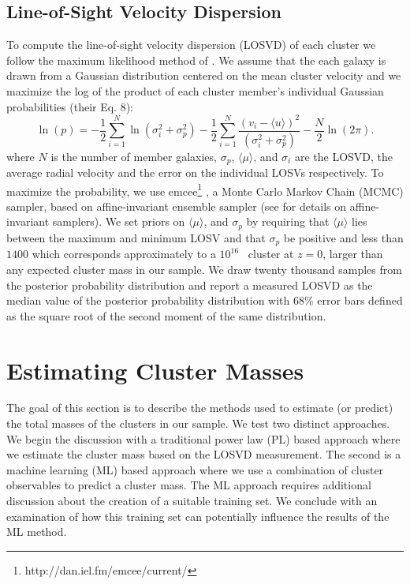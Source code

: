 \subsection{Line-of-Sight Velocity Dispersion}\label{2sec:LOSVD}
To compute the line-of-sight velocity dispersion (LOSVD) of each cluster we follow the maximum likelihood method of \cite{Walker2006}. We assume that the each galaxy is drawn from a Gaussian distribution centered on the mean cluster velocity and we maximize the log of the product of each cluster member's individual Gaussian probabilities (their Eq. 8):
\begin{equation}
  \label{2eq:log}
\ln(p)=-\frac{1}{2}\sum_{i=1}^{N}\ln(\sigma_i^2+\sigma_p^2)-\frac{1}{2}\sum_{i=1}^N\frac{(v_i-\langle u \rangle)^2}{(\sigma_i^2+\sigma_p^2)}-\frac{N}{2}\ln(2\pi).
\end{equation}
where $N$ is the number of member galaxies, $\sigma_p$, $\langle\mu\rangle$, and $\sigma_i$ are the LOSVD, the average radial velocity and the error on the individual LOSVs respectively. To maximize the probability, we use {\sc emcee}\footnote{http://dan.iel.fm/emcee/current/} \citep{Foreman-Mackey2013}, a Monte Carlo Markov Chain (MCMC) sampler, based on affine-invariant ensemble sampler (see \citealt{Goodman2010} for details on affine-invariant samplers). We set priors on $\langle\mu\rangle$, and $\sigma_p$ by requiring that $\langle\mu\rangle$ lies between the maximum and minimum LOSV and that $\sigma_p$ be positive and less than $1400$ \kms which corresponds approximately to a $10^{16}$ \Msol\ cluster at $z=0$, larger than any expected cluster mass in our sample. We draw twenty thousand samples from the posterior probability distribution and report a measured LOSVD as the median value of the posterior probability distribution with 68\% error bars defined as the square root of the second moment of the same distribution.

\section{Estimating Cluster Masses}
The goal of this section is to describe the methods used to estimate (or predict) the total masses of the clusters in our sample. We test two distinct approaches. We begin the discussion with a traditional power law (PL) based approach where we estimate the cluster mass based on the LOSVD measurement. The second is a machine learning (ML) based approach where we use a combination of cluster observables to predict a cluster mass. The ML approach requires additional discussion about the creation of a suitable training set. We conclude with an examination of how this training set can potentially influence the results of the ML method.   

